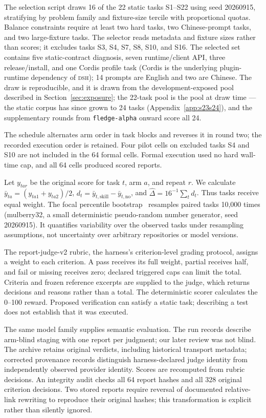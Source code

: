\documentclass[11pt]{article}
\newcommand{\framework}{\textsc{dsh}}
\begin{document}
The selection script draws 16 of the 22 static tasks S1--S22 using seed 20260915, stratifying by problem family and fixture-size tercile with proportional quotas. Balance constraints require at least two hard tasks, two Chinese-prompt tasks, and two large-fixture tasks. The selector reads metadata and fixture sizes rather than scores; it excludes tasks S3, S4, S7, S8, S10, and S16. The selected set contains five static-contract diagnosis, seven runtime/client API, three release/install, and one Cordis profile task (Cordis is the underlying plugin-runtime dependency of \framework{}); 14 prompts are English and two are Chinese. The draw is reproducible, and it is drawn from the development-exposed pool described in Section~\ref{sec:exposure}; the 22-task pool is the pool at draw time --- the static corpus has since grown to 24 tasks (Appendix~\ref{app:s23s24}), and the supplementary rounds from \texttt{fledge-alpha} onward score all 24.

The schedule alternates arm order in task blocks and reverses it in round two; the recorded execution order is retained. Four pilot cells on excluded tasks S4 and S10 are not included in the 64 formal cells. Formal execution used no hard wall-time cap, and all 64 cells produced scored reports.

Let $y_{tar}$ be the original score for task $t$, arm $a$, and repeat $r$. We calculate $\bar y_{ta}=(y_{ta1}+y_{ta2})/2$, $d_t=\bar y_{t,\mathrm{skill}}-\bar y_{t,\mathrm{no}}$, and $\widehat\Delta=16^{-1}\sum_t d_t$. Thus tasks receive equal weight. The focal percentile bootstrap~\citep{efron1993bootstrap} resamples paired tasks 10,000 times (mulberry32, a small deterministic pseudo-random number generator, seed 20260915). It quantifies variability over the observed tasks under resampling assumptions, not uncertainty over arbitrary repositories or model versions.

The report-judge-v2 rubric, the harness's criterion-level grading protocol, assigns a weight to each criterion. A pass receives its full weight, partial receives half, and fail or missing receives zero; declared triggered caps can limit the total. Criteria and frozen reference excerpts are supplied to the judge, which returns decisions and reasons rather than a total. The deterministic scorer calculates the 0--100 reward. Proposed verification can satisfy a static task; describing a test does not establish that it was executed.

The same model family supplies semantic evaluation. The run records describe arm-blind staging with one report per judgment; our later review was not blind. The archive retains original verdicts, including historical transport metadata; corrected provenance records distinguish harness-declared judge identity from independently observed provider identity. Scores are recomputed from rubric decisions. An integrity audit checks all 64 report hashes and all 328 original criterion decisions. Two stored reports require reversal of documented relative-link rewriting to reproduce their original hashes; this transformation is explicit rather than silently ignored.
\end{document}
